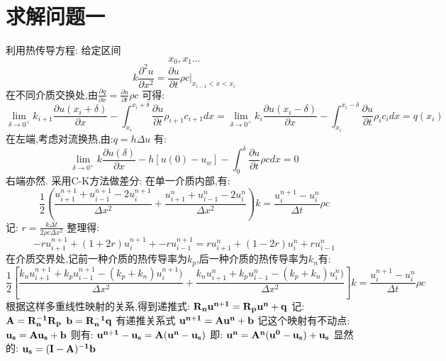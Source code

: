 \documentclass[utf8]{ctexart}
\begin{document}
    \section{求解问题一}

    利用热传导方程:
    给定区间\[x_0,x_1\dots\]
    \[k\frac{\partial^2 u}{\partial x^2} = \frac{\partial u}{\partial t}\rho c |_{x_{i-1}<x<x_{i}}\]
    在不同介质交换处,由\(\frac{\partial{q}}{\partial{x}} = \frac{\partial{u}}{\partial{t}} \rho c \)
    可得:
    \[ 
        \lim_{\delta \to 0^+} 
        k_{i+1 }\frac{\partial{u(x_i+\delta)}}{\partial{x}} 
        -
        \int_{x_i}^{x_i+\delta}\frac{\partial{u}}{\partial{t}} \rho_{i+1} c_{i+1} dx 
        = 
        \lim_{\delta \to 0^+} 
        k_{i} \frac{\partial{u(x_i-\delta)}}{\partial{x}}
        - 
        \int_{x_i}^{x_i-\delta}\frac{\partial{u}}{\partial{t}} \rho_i c_i dx
        =
        q(x_i)
    \]
    在左端,考虑对流换热,由:\(q = h\Delta u\)
    有:
    \[
        \lim_{\delta \to 0^+} 
        k\frac{\partial{u(\delta)}}{\partial{x}} 
        - 
        h[u(0) - u_w]
        -
        \int_{0}^{\delta}\frac{\partial{u}}{\partial{t}} \rho c dx 
        = 0
    \]
    右端亦然.
    采用C-K方法做差分:
    在单一介质内部,有:
    \[
        \frac{1}{2}
        \left(
            \frac{u_{i+1}^{n+1} + u_{i-1}^{n+1} - 2u_{i}^{n+1} }{\Delta x^2}
            +
            \frac{u_{i+1}^{n} + u_{i-1}^{n} - 2u_{i}^{n} }{\Delta x^2}
        \right)
        k
        =
        \frac{ u_{i}^{n+1} - u_{i}^{n} }{\Delta t} \rho c
    \]
    记:
    \( r = \frac{k \Delta t}{ 2 \rho c \Delta x^2 } \)
    整理得:
    \[
        -ru_{i+1}^{n+1} + (1+2r)u_{i}^{n+1} + -ru_{i-1}^{n+1}
        =
        ru_{i+1}^{n} + (1-2r)u_{i}^{n} + ru_{i-1}^{n}
    \]
    在介质交界处,记前一种介质的热传导率为\(k_p\),后一种介质的热传导率为\(k_n\)有:
    \[
        \frac{1}{2}
        \left[
            \frac{k_n u_{i+1}^{n+1} + k_p u_{i-1}^{n+1} - (k_p+k_n)u_{i}^{n+1}) }{\Delta x^2}
            +
            \frac{k_n u_{i+1}^{n} + k_p u_{i-1}^{n} - (k_p+k_n)u_{i}^{n}) }{\Delta x^2}
        \right]
        k
        =
        \frac{ u_{i}^{n+1} - u_{i}^{n} }{\Delta t} \rho c
    \]
    根据这样多重线性映射的关系,得到递推式:
    \(\bf{R_n}\bf{u}^{n+1} = \bf{R_p}\bf{u}^{n} + \bf{q}\)
    记:
    \(\bf{A} = \bf{R}_n^{-1}\bf{R}_p\)
    \(\bf{b} = \bf{R}_n^{-1}\bf{q}\)
    有递推关系式
    \(\bf{u}^{n+1} = \bf{A}\bf{u}^{n} + \bf{b}\)
    记这个映射有不动点:
    \(\bf{u}_s = \bf{A}\bf{u}_s + \bf{b}\)
    则有:
    \(  \bf{u}^{n+1} - \bf{u}_s = \bf{A} (\bf{u}^n - \bf{u}_s) \)
    即:
    \(  \bf{u}^{n} = \bf{A}^n (\bf{u}^0 - \bf{u}_s) + \bf{u}_s\)
    显然的:
    \(\bf{u}_s = (\bf{I} - \bf{A})^{-1}\bf{b}\)
\end{document}
